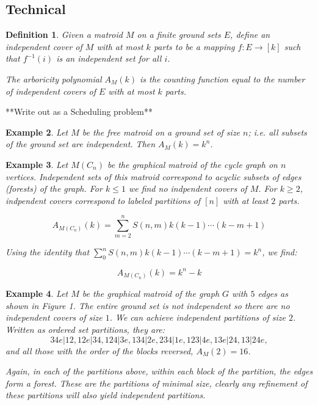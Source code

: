 \documentclass[11pt,letter]{amsart}
\newtheorem{definition}{Definition}
\newtheorem{example}[definition]{Example}
\begin{document}
\subsection{Technical}

\begin{definition} Given a matroid $M$ on a finite ground sets $E$, define an independent cover of $M$ with at most $k$ parts to be a mapping $f : E \rightarrow [k]$ such that $f^{-1}(i)$ is an independent set for all $i$.  

  The arboricity polynomial $A_M(k)$ is the counting function equal to the number of independent covers of $E$ with at most $k$ parts.
\end{definition}

**Write out as a  Scheduling problem**

\begin{example}

Let $M$ be the free matroid on a ground set of size $n$; i.e. all subsets of the ground set are independent.  Then $A_M(k) = k^n$.  

\end{example}

\begin{example}

Let $M(C_n)$ be the graphical matroid of the cycle graph on $n$
vertices.  Independent sets of this matroid correspond to acyclic
subsets of edges (forests) of the graph.  For $k \leq 1$ we find no
indpendent covers of $M$.  For $k \geq 2$, indpendent covers
correspond to labeled partitions of $[n]$ with at least $2$ parts.

$$A_{M(C_n)}(k) = \sum_{m=2}^{n} S(n,m) k(k-1) \cdots (k-m+1) $$

Using the identity that $\sum_0^n S(n,m) k(k-1) \cdots (k-m+1) = k^n$, we find:

$$A_{M(C_n)}(k) = k^n - k $$

\end{example}



\begin{example}
Let $M$ be the graphical matroid of the graph $G$ with $5$ edges as
shown in Figure 1.  The entire ground set is not independent so there
are no independent covers of size $1$.  We can achieve independent
partitions of size $2$.  Written as ordered set partitions, they are:
$$ 34e|12, 12e|34, 124|3e, 134|2e, 234|1e, 123|4e, 13e|24, 13|24e, $$
and all those with the order of the blocks reversed, $A_M(2) = 16$.  

Again, in each of the partitions above, within each block of the
partition, the edges form a forest.  These are the partitions of
minimal size, clearly any refinement of these partitions will also
yield independent partitions.

\end{example}
\end{document}
